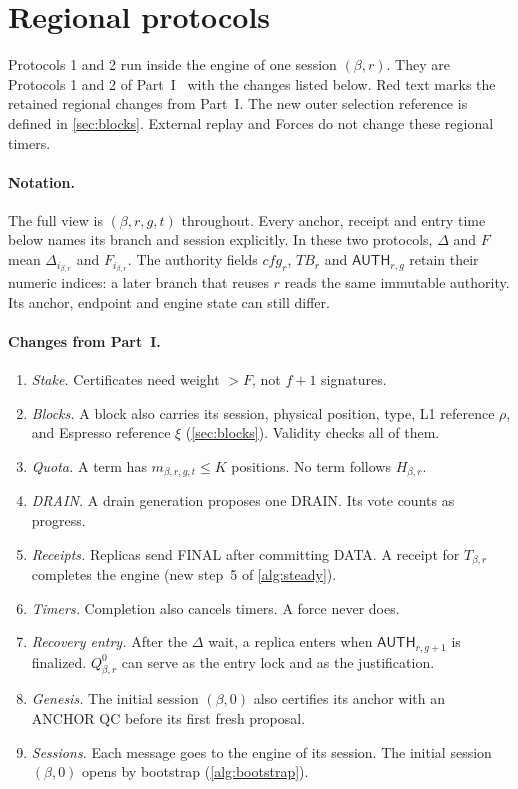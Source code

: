 \documentclass[11pt,a4paper]{article}
\newcommand{\RR}[1]{{\color{rrRed}#1}}
\newcommand{\TB}{\mathit{TB}}
\newcommand{\tagg}[1]{\ensuremath{\mathsf{#1}}}
\newcounter{protocol}
\begin{document}
\section{Regional protocols}
\label{sec:protocols}
Protocols 1 and 2 run inside the engine of one session $(\beta,r)$. They are
Protocols 1 and 2 of Part~I~\cite{part1} with the changes listed below.
\RR{Red text} marks the retained regional changes from Part~I.
The new outer selection reference is defined in \cref{sec:blocks}.
External replay and Forces do not change these regional timers.

\paragraph{Notation.}
The full view is $(\beta,r,g,t)$ throughout. Every anchor, receipt and
entry time below names its branch and session explicitly. In these two
protocols, $\Delta$ and $F$ mean $\Delta_{i_{\beta,r}}$ and
$F_{i_{\beta,r}}$. The authority fields $\mathit{cfg}_r$, $\TB_r$ and
$\tagg{AUTH}_{r,g}$ retain their numeric indices: a later branch that
reuses $r$ reads the same immutable authority. Its anchor, endpoint and
engine state can still differ.

\paragraph{Changes from Part~I.}
\begin{enumerate}[label=\arabic*.]
\item \emph{Stake.} Certificates need weight $>F$, not $f+1$ signatures.
\item \emph{Blocks.} A block also carries its session, physical
position, type, L1 reference $\rho$, and Espresso reference $\xi$
(\cref{sec:blocks}). Validity
checks all of them.
\item \emph{Quota.} A term has $m_{\beta,r,g,t}\le K$ positions. No term follows
$H_{\beta,r}$.
\item \emph{DRAIN.} A drain generation proposes one DRAIN. Its vote
counts as progress.
\item \emph{Receipts.} Replicas send FINAL after committing DATA. A
receipt for $T_{\beta,r}$ completes the engine (new step~5 of \cref{alg:steady}).
\item \emph{Timers.} Completion also cancels timers. A force never does.
\item \emph{Recovery entry.} After the $\Delta$ wait, a replica enters
when $\tagg{AUTH}_{r,g+1}$ is finalized. $Q_{\beta,r}^0$ can serve as the entry
lock and as the justification.
\item \emph{Genesis.} The initial session $(\beta,0)$ also certifies its anchor with an
ANCHOR QC before its first fresh proposal.
\item \emph{Sessions.} Each message goes to the engine of its session.
The initial session $(\beta,0)$ opens by bootstrap (\cref{alg:bootstrap}).
\end{enumerate}
\end{document}
